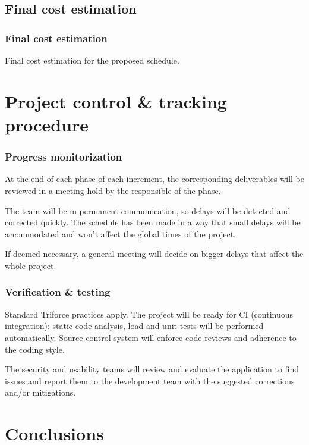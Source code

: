 \documentclass[10pt, compress,usetitleprogressbar,aspectratio=1610]{beamer}
\begin{document}
\subsection{Final cost estimation}
\begin{frame}
\frametitle{Final cost estimation}
\begin{table}[hbtp]
\centering

\caption{Final cost estimation for the proposed schedule.}
\label{tblCostEstimate}
\end{table}
\end{frame}

\section{Project control \& tracking procedure}

\begin{frame}
\frametitle{Progress monitorization}
At the end of each phase of each increment, the corresponding deliverables will be reviewed in a meeting hold by the responsible of the phase.

The team will be in permanent communication, so delays will be detected and corrected quickly. The schedule has been made in a way that small delays will be accommodated and won't affect the global times of the project.

If deemed necessary, a general meeting will decide on bigger delays that affect the whole project.
\end{frame}

\begin{frame}
\frametitle{Verification \& testing}
Standard Triforce practices apply. The project will be ready for CI (continuous integration): static code analysis, load and unit tests will be performed automatically. Source control system will enforce code reviews and adherence to the coding style.

The security and usability teams will review and evaluate the application to find issues and report them to the development team with the suggested corrections and/or mitigations.
\end{frame}

\section{Conclusions}
\end{document}
